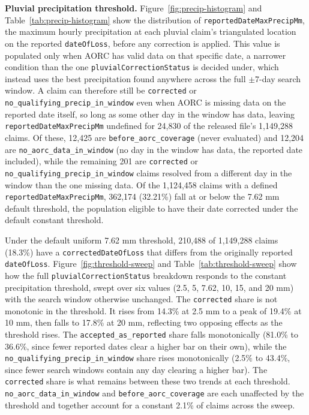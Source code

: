 \textbf{Pluvial precipitation threshold.}
Figure~\ref{fig:precip-histogram} and
Table~\ref{tab:precip-histogram} show the distribution of
\texttt{reportedDateMaxPrecipMm}, the maximum hourly precipitation at
each pluvial claim's triangulated location on the reported
\texttt{dateOfLoss}, before any correction is applied. This value is
populated only when AORC has valid data on that specific date, a
narrower condition than the one \texttt{pluvialCorrectionStatus} is
decided under, which instead uses the best precipitation found
anywhere across the full $\pm$7-day search window. A claim can
therefore still be \texttt{corrected} or
\texttt{no\_qualifying\_precip\_in\_window} even when AORC is missing
data on the reported date itself, so long as some other day in the
window has data, leaving \texttt{reportedDateMaxPrecipMm} undefined
for 24,830 of the released file's 1,149,288 claims. Of these, 12,425
are \texttt{before\_aorc\_coverage} (never evaluated) and 12,204 are
\texttt{no\_aorc\_data\_in\_window} (no day in the window has data, the
reported date included), while the remaining 201 are
\texttt{corrected} or \texttt{no\_qualifying\_precip\_in\_window}
claims resolved from a different day in the window than the one
missing data. Of the 1,124,458 claims with a defined
\texttt{reportedDateMaxPrecipMm}, 362,174 (32.21\%) fall at or below
the 7.62 mm default threshold, the population eligible to have their
date corrected under the default constant threshold.

Under the default uniform 7.62 mm threshold, 210,488 of 1,149,288 claims (18.3\%) have a
\texttt{correctedDateOfLoss} that differs from the originally reported
\texttt{dateOfLoss}. Figure~\ref{fig:threshold-sweep} and
Table~\ref{tab:threshold-sweep} show how the full
\texttt{pluvialCorrectionStatus} breakdown responds to the constant
precipitation threshold, swept over six values (2.5, 5, 7.62, 10, 15,
and 20 mm) with the search window otherwise unchanged. The
\texttt{corrected} share is not monotonic in the threshold. It rises
from 14.3\% at 2.5 mm to a peak of 19.4\% at 10 mm, then falls to
17.8\% at 20 mm, reflecting two opposing effects as the threshold
rises. The \texttt{accepted\_as\_reported} share falls monotonically
(81.0\% to 36.6\%, since fewer reported dates clear a higher bar on
their own), while the \texttt{no\_qualifying\_precip\_in\_window} share
rises monotonically (2.5\% to 43.4\%, since fewer search windows
contain any day clearing a higher bar). The \texttt{corrected} share
is what remains between these two trends at each threshold.
\texttt{no\_aorc\_data\_in\_window} and \texttt{before\_aorc\_coverage}
are each unaffected by the threshold and together account for a
constant 2.1\% of claims across the sweep.

